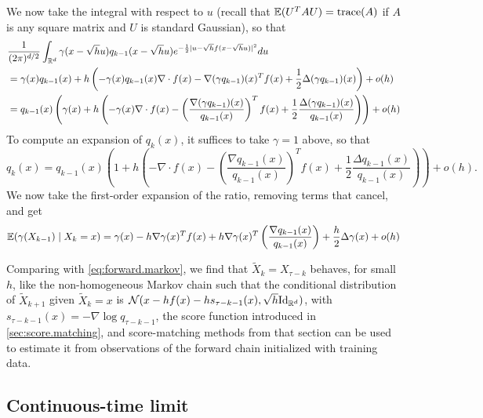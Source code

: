 We now take the integral with respect to $u$ (recall that $\bm{\mathbb E}(U^T A U) = {\mathrm{trace}}(A)$ if $A$ is any square matrix and $U$ is standard Gaussian), so that
\begin{align*}
&\frac{1}{(2\pi)^{d/2}}\int_{{\mathbb{R}}^d}\gamma(x - \sqrt h u)  q_{k-1}(x - \sqrt h u) e^{-\frac1{2} |u - \sqrt h f(x - \sqrt h u)|^2} du\\
&=  \gamma(x)  q_{k-1}(x) + h \left( -\gamma(x)  q_{k-1}(x) \nabla \cdot f(x) 
- \nabla (\gamma q_{k-1})(x)^T f(x) + \frac 12 \Delta(\gamma q_{k-1})(x)\right) + o(h)\\
&=  q_{k-1}(x) \left(\gamma(x)  + h \left( -\gamma(x)  \nabla \cdot f(x) 
- \left(\frac{\nabla (\gamma q_{k-1})(x)}{q_{k-1}(x)}\right)^T f(x) + \frac 12 \frac{\Delta(\gamma q_{k-1})(x)}{q_{k-1}(x)}\right)\right) + o(h)
\end{align*}
To compute an expansion of  $q_k(x)$, it suffices to take $\gamma = 1$ above, so that
\[
q_k(x) =   q_{k-1}(x) \left(1  + h \left( - \nabla \cdot f(x) 
- \left(\frac{\nabla q_{k-1}(x)}{q_{k-1}(x)}\right)^T f(x) + \frac 12 \frac{\Delta q_{k-1}(x)}{q_{k-1}(x)}\right)\right) + o(h).
\]
We now take the first-order expansion of the ratio, removing terms that cancel, and get 
\[
\bm{\mathbb E}(\gamma(X_{k-1}) \mid X_{k} = x) = \gamma(x) - h \nabla \gamma(x)^T f(x) + h\nabla \gamma(x)^T\left(\frac{\nabla q_{k-1}(x)}{q_{k-1}(x)} \right) + \frac{h}{2} \Delta \gamma(x) + o(h)
\]

Comparing with \cref{eq:forward.markov}, we find that  $\tilde X_k = X_{\tau-k}$ behaves, for small $h$, like the non-homogeneous Markov chain
such that the conditional distribution of $\tilde X_{k+1}$ given $\tilde X_{k} = x$ is $\CN(x - h f(x) - h s_{\tau-k-1}(x), \sqrt h \Id[d])$, with $s_{\tau-k-1}(x) = - \nabla \log q_{\tau-k-1}$, the score function introduced in \cref{sec:score.matching}, and score-matching methods from that section can be used to estimate it from observations of the forward chain initialized with training data. 

\subsection{Continuous-time limit}
\label{sec:reversed.diffusion}

